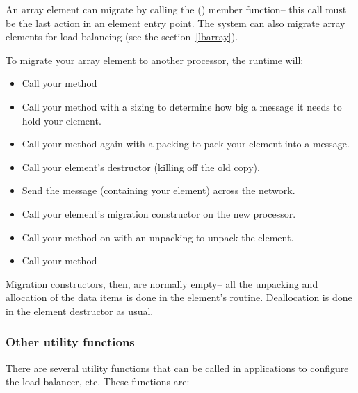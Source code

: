 An array element can migrate by calling the () member function-- this call must be the last action
in an element entry point.  The system can also migrate array elements
for load balancing (see the section~\ref{lbarray}).

To migrate your array element to another processor, the \charmpp{}
runtime will:

\begin{itemize}
\item Call your  method
\item Call your  method with a sizing  to determine how 
big a message it needs to hold your element.
\item Call your  method again with a packing  to pack 
your element into a message.
\item Call your element's destructor (killing off the old copy).
\item Send the message (containing your element) across the network.
\item Call your element's migration constructor on the new processor.
\item Call your  method on with an unpacking  to unpack 
the element.
\item Call your  method
\end{itemize}

Migration constructors, then, are normally empty-- all the unpacking
and allocation of the data items is done in the element's  routine.
Deallocation is done in the element destructor as usual.


\subsubsection{Other utility functions}

There are several utility functions that can be called in applications to
configure the load balancer, etc. These functions are:

